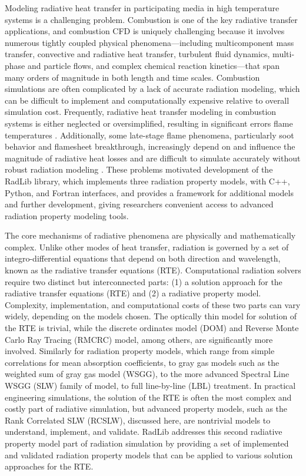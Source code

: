 \documentclass[preprint,12pt]{elsarticle}
\begin{document}
Modeling radiative heat transfer in participating media in high temperature systems is a challenging problem. Combustion is one of the key radiative transfer applications, and combustion CFD is uniquely challenging because it involves numerous tightly coupled physical phenomena---including multicomponent mass transfer, convective and radiative heat transfer, turbulent fluid dynamics, multi-phase and particle flows, and complex chemical reaction kinetics---that span many orders of magnitude in both length and time scales. Combustion simulations are often complicated by a lack of accurate radiation modeling, which can be difficult to implement and computationally expensive relative to overall simulation cost. Frequently, radiative heat transfer modeling in combustion systems is either neglected or oversimplified, resulting in significant errors flame temperatures \citep{Modest_2016}. Additionally, some late-stage flame phenomena, particularly soot behavior and flamesheet breakthrough, increasingly depend on and influence the magnitude of radiative heat losses and are difficult to simulate accurately without robust radiation modeling \cite{Modest_2013}. These problems motivated development of the RadLib library, which implements three radiation property models, with C++, Python, and Fortran interfaces, and provides a framework for additional models and further development, giving researchers convenient access to advanced radiation property modeling tools. 

The core mechanisms of radiative phenomena are physically and mathematically complex. Unlike other modes of heat transfer, radiation is governed by a set of integro-differential equations that depend on both direction and wavelength, known as the radiative transfer equations (RTE). Computational radiation solvers require two distinct but interconnected parts: (1) a solution approach for the radiative transfer equations (RTE) and (2) a radiative property model. 
Complexity, implementation, and computational costs of these two parts can vary widely, depending on the models chosen. The optically thin model for solution of the RTE is trivial, while the discrete ordinates model (DOM) and Reverse Monte Carlo Ray Tracing (RMCRC) model, among others, are significantly more involved. Similarly for radiation property models, which range from simple correlations for mean absorption coefficients, to gray gas models such as the weighted sum of gray gas model (WSGG), to the more advanced Spectral Line WSGG (SLW) family of model, to full line-by-line (LBL) treatment. In practical engineering simulations, the solution of the RTE is often the most complex and costly part of radiative simulation, but advanced property models, such as the Rank Correlated SLW (RCSLW), discussed here, are nontrivial models to understand, implement, and validate.
RadLib addresses this second radiative property model part of radiation simulation by providing a set of implemented and validated radiation property models that can be applied to various solution approaches for the RTE. 
\end{document}
